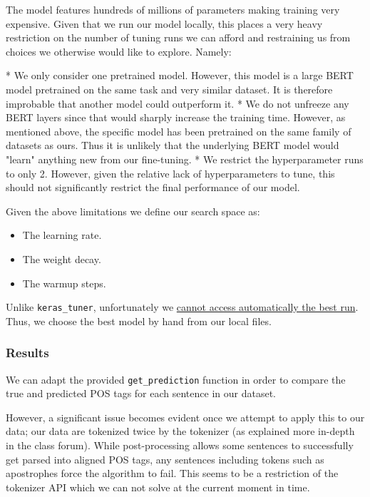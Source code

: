 \documentclass[10pt, a4paper]{article}
\def\code#1{\texttt{#1}}
\begin{document}
	
	The model features hundreds of millions of parameters making training very expensive. Given that we run our model locally, this places a very heavy restriction on the number of tuning runs we can afford and restraining us from choices we otherwise would like to explore. Namely:
	
	* We only consider one pretrained model. However, this model is a large BERT model pretrained on the same task and very similar dataset. It is therefore improbable that another model could outperform it.
	* We do not unfreeze any BERT layers since that would sharply increase the training time. However, as mentioned above, the specific model has been pretrained on the same family of datasets as ours. Thus it is unlikely that the underlying BERT model would "learn" anything new from our fine-tuning.
	* We restrict the hyperparameter runs to only 2. However, given the relative lack of hyperparameters to tune, this should not significantly restrict the final performance of our model.
	
	Given the above limitations we define our search space as:
	\begin{itemize}
		\item The learning rate.
		\item The weight decay.
		\item The warmup steps.
	\end{itemize}
	
	Unlike \code{keras\_tuner}, unfortunately we \href{https://discuss.huggingface.co/t/oserror-unable-to-load-weights-from-pytorch-checkpoint-file/3406}{cannot access automatically the best run}. Thus, we choose the best model by hand from our local files.
	
	\subsubsection{Results}
	
	We can adapt the provided \code{get\_prediction} function in order to compare the true and predicted POS tags for each sentence in our dataset. 
	
	However, a significant issue becomes evident once we attempt to apply this to our data; our data are tokenized twice by the tokenizer (as explained more in-depth in the class forum). While post-processing allows some sentences to successfully get parsed into aligned POS tags, any sentences including tokens such as apostrophes force the algorithm to fail. This seems to be a restriction of the tokenizer API which we can not solve at the current moment in time.
	
\end{document}
